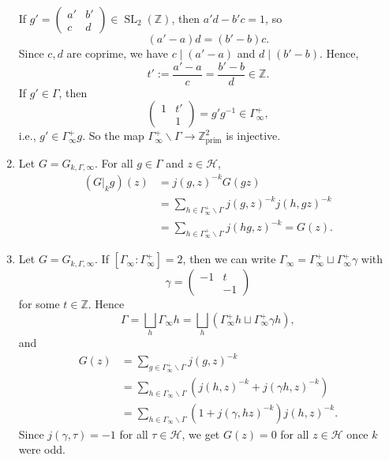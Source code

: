\documentclass{article}
\theoremstyle{definition}
\theoremstyle{remark}
\newcommand{\Z}{\mathbb{Z}}
\DeclareMathOperator{\SL}{SL}
\newcommand{\prim}{\mathrm{prim}}
\newcommand{\under}{\backslash}
\begin{document}
\begin{enumerate}
If $g' = \begin{pmatrix}
    a'&b'\\c&d
\end{pmatrix}\in \SL_2(\Z)$,
then $a'd - b'c = 1$, so \[(a'-a)d = (b'-b)c.\]
Since $c, d$ are coprime, we have $c \mid (a'-a)$ and $d \mid (b'-b) $. Hence, \[t' := \frac{a'-a}{c} = \frac{b'-b}{d}\in\Z.\]
If $g'\in\Gamma$, then \[\begin{pmatrix}
    1& t'\\ &1
\end{pmatrix} = g'g^{-1}\in\Gamma_\infty^+,\]
i.e., $g'\in \Gamma_\infty^+ g$.
So the map $\Gamma_\infty^+\backslash\Gamma\to \Z^2_\prim$ is injective.


\item Let $G = G_{k,\Gamma, \infty}$. For all $g\in\Gamma$ and $z\in\mathcal{H}$,
\begin{align*}
    (G|_k g)(z) &= j(g, z)^{-k}G(gz)\\
    &= \sum_{h\in\Gamma_\infty^+\under\Gamma}j(g, z)^{-k}j(h, gz)^{-k}\\
    &= \sum_{h\in\Gamma_\infty^+\under\Gamma} j(hg, z)^{-k} = G(z).
\end{align*}

\item Let $G = G_{k,\Gamma, \infty}$.
If $[\Gamma_\infty : \Gamma_\infty^+] = 2$,
then we can write $\Gamma_\infty = \Gamma_\infty^+\sqcup\Gamma_\infty^+\gamma$ with \[\gamma = \begin{pmatrix}
    -1 & t \\ & -1
\end{pmatrix}\]for some $t\in \Z$.
Hence \[\Gamma = \bigsqcup_h \Gamma_\infty h = \bigsqcup_h \left(\Gamma_\infty^+h\sqcup\Gamma_\infty^+\gamma h\right),\]
and 
\begin{align*}
    G(z) &= \sum_{g\in\Gamma_\infty^+\under\Gamma} j(g, z)^{-k}\\
    &= \sum_{h\in\Gamma_\infty\under\Gamma} \left( j(h, z)^{-k} + j(\gamma h, z)^{-k} \right)\\
    &= \sum_{h\in\Gamma_\infty\under\Gamma} (1 + j(\gamma, hz)^{-k}) j(h, z)^{-k}.
\end{align*}
Since $j(\gamma, \tau) = - 1$ for all $\tau\in\mathcal{H}$, we get $G(z) = 0$ for all $z\in\mathcal{H}$ once $k$ were odd.



\end{enumerate}
\end{document}
